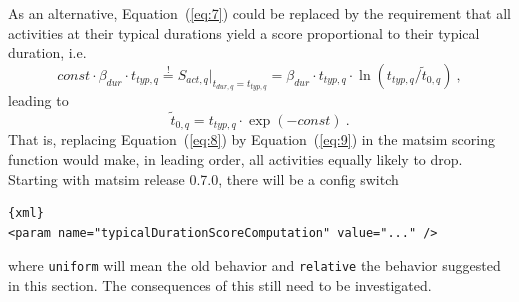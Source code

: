As an alternative, Equation~(\ref{eq:7}) could be replaced by the requirement that all activities at their typical durations yield a score proportional to their typical duration, i.e.\
\begin{equation}
const \cdot \beta_{dur} \cdot t_{typ,q} \stackrel!= S_{act,q} \Big|_{t_{dur,q} = t_{typ,q}}
=
\beta_{dur} \cdot t_{typ,q} \cdot \ln(t_{typ,q}/\tilde t_{0,q}) \ , 
\end{equation}
leading to
\begin{equation}
\tilde t_{0,q} = t_{typ,q} \cdot \exp( - const ) \ .
\label{eq:9}
\end{equation}
That is, replacing Equation~(\ref{eq:8}) by Equation~(\ref{eq:9}) in the \gls{matsim} scoring function would make, in leading order, all activities equally likely to drop.  Starting with \gls{matsim} release 0.7.0, there will be a config switch 
\begin{lstlisting}{xml}
<param name="typicalDurationScoreComputation" value="..." />
\end{lstlisting}
where \lstinline{uniform} will mean the old behavior and \lstinline{relative} the behavior suggested in this section.  The consequences of this still need to be investigated.



%


